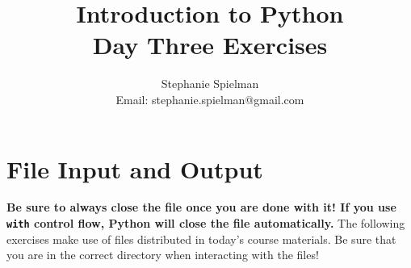 \documentclass{article}[12pt]
\newcommand{\code}[1]{\texttt{#1}}  %
\begin{document}
\title{Introduction to Python \\ Day Three Exercises}
\author{Stephanie Spielman \\ \footnotesize{Email: stephanie.spielman@gmail.com}}
\date{}
\maketitle{}


\section{File Input and Output}

\textbf{Be sure to always close the file once you are done with it! If you use \code{with} control flow, Python will close the file automatically.}
The following exercises make use of files distributed in today's course materials. Be sure that you are in the correct directory when interacting with the files!
\end{document}
